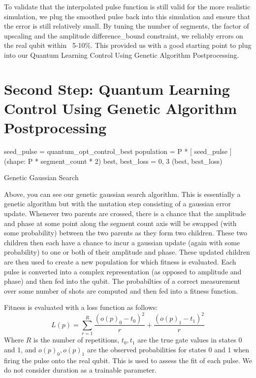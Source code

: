 \documentclass{article}
\begin{document}
To validate that the interpolated pulse function is still valid for the more realistic simulation, we plug 
the smoothed pulse back into this simulation and ensure that the error is still relatively small. By 
tuning the number of segments, the factor of upscaling and the amplitude difference\_bound constraint, 
we reliably errors on the real qubit within ~5-10\%. This provided us with a good starting point to plug 
into our Quantum Learning Control Using Genetic Algorithm Postprocessing.

\section{Second Step: Quantum Learning Control Using Genetic Algorithm Postprocessing}
\begin{algorithm}[H]
\SetAlgoLined
{}
    seed\_pulse = quantum\_opt\_control\_best\;
    population = P * [ seed\_pulse ] (shape: P * segment\_count * 2)\;
    best, best\_loss = 0, 3\;
    \Return (best, best\_loss)
\caption{Genetic Gaussian Search}
\end{algorithm}

Above, you can see our genetic gaussian search algorithm. This is essentially a genetic algorithm
but with the mutation step consisting of a gaussian error update. Whenever two parents are crossed,
there is a chance that the amplitude and phase at some point along the segment count axis will be swapped
(with some probability)
between the two parents as they form two children. These two children then each have a chance to incur 
a gaussian update (again with some probability) to one or both of their amplitude and phase. These updated
children are then used to create a new population for which fitness is evaluated. Each pulse is
converted into a complex representation (as opposed to amplitude and phase) and then fed into the 
qubit. The probabilties of a correct measurement over some number of shots are computed and then fed into
a fitness function.

Fitness is evaluated with a loss function as follows:
$$L(p) = \sum_{r=1}^R \frac{(o(p)_0 - t_0)^2}{r} + \frac{(o(p)_1 - t_1)^2}{r}$$
Where $R$ is the number of repetitions, $t_0, t_1$ are the true gate values in states 0 and 1, and $o(p)_0, o(p)_1$
are the observed probabilities for states 0 and 1 when firing the pulse onto the real qubit. This is used 
to assess the fit of each pulse. We do not consider duration as a trainable parameter.
\end{document}
